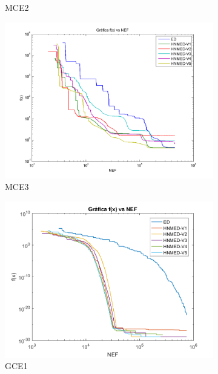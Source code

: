 \begin{figure}
\begin{subfigure}[b]{0.49\linewidth}
		\caption{MCE2} \label{fig:M2} 
	\end{subfigure}
	\begin{subfigure}[b]{0.49\linewidth}
		\includegraphics[width=\linewidth]{Figures/Grafica_Convergencia_Problema_3}
		\caption{MCE3} \label{fig:M3} 
	\end{subfigure}
	\begin{subfigure}[b]{0.49\linewidth}
		\includegraphics[width=\linewidth]{Figures/Grafica_Convergencia_Problema_4}
		\caption{GCE1} \label{fig:G1} 
	\end{subfigure}
	\begin{subfigure}[b]{0.49\linewidth}

\end{subfigure}
\end{figure}
